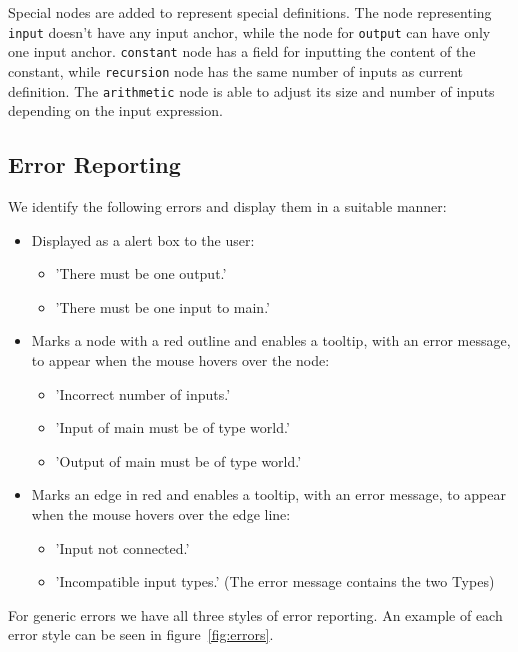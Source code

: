\documentclass[12pt,UTF8,a4]{article}
\newcommand{\code}[1]{\texttt{#1}}
\begin{document}
Special nodes are added to represent special definitions. The node
representing \code{input} doesn't have any input anchor, while the
node for \code{output} can have only one input anchor. \code{constant}
node has a field for inputting the content of the constant, while
\code{recursion} node has the same number of inputs as current
definition. The \code{arithmetic} node is able to adjust its size and
number of inputs depending on the input expression.

\subsection{Error Reporting}

We identify the following errors and display them in a suitable manner:

\begin{itemize}
  \item Displayed as a alert box to the user:
  \begin{itemize}
    \item 'There must be one output.'
    \item 'There must be one input to main.'
  \end{itemize}
  \item Marks a node with a red outline and enables a tooltip, with an error message, to appear when the mouse hovers over the node:
  \begin{itemize}
    \item 'Incorrect number of inputs.'
    \item 'Input of main must be of type world.'
    \item 'Output of main must be of type world.'
  \end{itemize}
  \item Marks an edge in red and enables a tooltip, with an error message, to appear when the mouse hovers over the edge line:
  \begin{itemize}
    \item 'Input not connected.'
    \item 'Incompatible input types.' (The error message contains the two Types)
  \end{itemize}
\end{itemize}

For generic errors we have all three styles of error reporting. An example of each error style can be seen in figure~\ref{fig:errors}.
\end{document}
